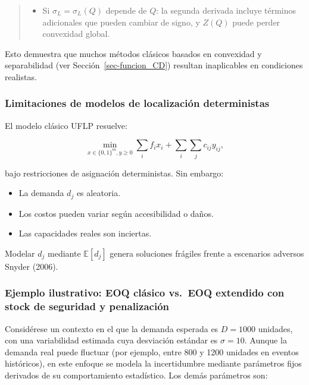 \documentclass[
  spanish,
  us-letterpaper,
]{scrreprt}
\providecommand{\tightlist}{%
  \setlength{\itemsep}{0pt}\setlength{\parskip}{0pt}}
\numberwithin{equation}{section}
\begin{document}
\begin{quote}
\begin{itemize}
\tightlist
\item
  Si \(\sigma_L = \sigma_L(Q)\) depende de \(Q\): la segunda derivada
  incluye términos adicionales que pueden cambiar de signo, y \(Z(Q)\)
  puede perder convexidad global.
\end{itemize}
\end{quote}

Esto demuestra que muchos métodos clásicos basados en convexidad y
separabilidad (ver Sección~\ref{sec-funcion_CD}) resultan inaplicables
en condiciones realistas.

\subsubsection{Limitaciones de modelos de localización
deterministas}\label{sec-determinista}

El modelo clásico UFLP resuelve:

\[
\min_{x\in\{0,1\}^m, y\ge 0}\sum_{i}f_i x_i + \sum_{i}\sum_j c_{ij}y_{ij},
\]

bajo restricciones de asignación deterministas. Sin embargo:

\begin{itemize}
\tightlist
\item
  La demanda \(d_j\) es aleatoria.
\item
  Los costos pueden variar según accesibilidad o daños.
\item
  Las capacidades reales son inciertas.
\end{itemize}

Modelar \(d_j\) mediante \(\mathbb{E}[d_j]\) genera soluciones frágiles
frente a escenarios adversos Snyder (2006).

\subsubsection{Ejemplo ilustrativo: EOQ clásico vs.~EOQ extendido con
stock de seguridad y
penalización}\label{ejemplo-ilustrativo-eoq-cluxe1sico-vs.-eoq-extendido-con-stock-de-seguridad-y-penalizaciuxf3n}

Considérese un contexto en el que la demanda esperada es \(D=1000\)
unidades, con una variabilidad estimada cuya desviación estándar es
\(\sigma=10\). Aunque la demanda real puede fluctuar (por ejemplo, entre
800 y 1200 unidades en eventos históricos), en este enfoque se modela la
incertidumbre mediante parámetros fijos derivados de su comportamiento
estadístico. Los demás parámetros son:
\end{document}
